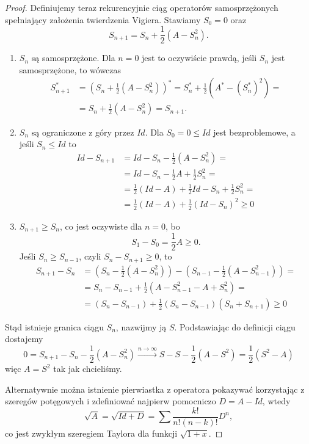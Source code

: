 \begin{proof}
  Definiujemy teraz rekurencyjnie ciąg operatorów samosprzężonych spełniający założenia twierdzenia Vigiera. Stawiamy $S_0=0$ oraz
  $$S_{n+1}=S_n+\frac{1}{2}(A-S_n^2).$$
  \begin{enumerate}
    \item $S_n$ są samosprzężone. Dla $n=0$ jest to oczywiście prawdą, jeśli $S_n$ jest samosprzężone, to wówczas
      \begin{align*}
        S_{n+1}^*&=(S_n+\frac{1}{2}(A-S_n^2))^*=S_n^*+\frac{1}{2}(A^*-(S_n^*)^2)=\\ 
                 &=S_n+\frac{1}{2}(A-S_n^2)=S_{n+1}.
      \end{align*}
    \item $S_n$ są ograniczone z góry przez $Id$. 
      Dla $S_0=0\leq Id$ jest bezproblemowe, a jeśli $S_n\leq Id$ to
      \begin{align*}
        Id-S_{n+1}&=Id-S_n-\frac{1}{2}(A-S_n^2)=\\ 
                  &=Id-S_n-\frac{1}{2}A+\frac{1}{2}S_n^2=\\ 
                  &=\frac{1}{2}(Id-A)+\frac{1}{2}Id-S_n+\frac{1}{2}S_n^2=\\ 
                  &=\frac{1}{2}(Id-A)+\frac{1}{2}(Id-S_n)^2\geq0
      \end{align*}
    \item $S_{n+1}\geq S_n$, co jest oczywiste dla $n=0$, bo 
      $$S_1-S_0=\frac{1}{2}A\geq 0.$$
      Jeśli $S_n\geq S_{n-1}$, czyli $S_n-S_{n+1}\geq 0$, to 
      \begin{align*}
        S_{n+1}-S_n&=(S_n-\frac{1}{2}(A-S_n^2))-(S_{n-1}-\frac{1}{2}(A-S_{n-1}^2))=\\ 
                   &=S_n-S_{n-1}+\frac{1}{2}(A-S_{n-1}^2-A+S_n^2)=\\ 
                   &=(S_n-S_{n-1})+\frac{1}{2}(S_n-S_{n-1})(S_n+S_{n+1})\geq 0
      \end{align*}
  \end{enumerate}
  Stąd istnieje granica ciągu $S_n$, nazwijmy ją $S$. Podstawiając do definicji ciągu dostajemy
  $$0=S_{n+1}-S_n-\frac{1}{2}(A-S_n^2)\xrightarrow{n\to\infty}S-S-\frac{1}{2}(A-S^2)=\frac{1}{2}(S^2-A)$$
  więc $A=S^2$ tak jak chcieliśmy.

  Alternatywnie można istnienie pierwiastka z operatora pokazywać korzystając z szeregów potęgowych i zdefiniować najpierw pomocniczo $D=A-Id$, wtedy 
  $$\sqrt{A}=\sqrt{Id+D}=\sum\frac{k!}{n!(n-k)!}D^n,$$
  co jest zwykłym szeregiem Taylora dla funkcji $\sqrt{1+x}$.
  \bigskip 


\end{proof}
